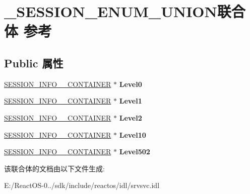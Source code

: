 \hypertarget{union___s_e_s_s_i_o_n___e_n_u_m___u_n_i_o_n}{}\section{\+\_\+\+S\+E\+S\+S\+I\+O\+N\+\_\+\+E\+N\+U\+M\+\_\+\+U\+N\+I\+O\+N联合体 参考}
\label{union___s_e_s_s_i_o_n___e_n_u_m___u_n_i_o_n}
\subsection*{Public 属性}
\begin{DoxyCompactItemize}
\item 
\mbox{\label{union___s_e_s_s_i_o_n___e_n_u_m___u_n_i_o_n_a33d9905dafc13625a026caff8927b6a0}} 
\hyperlink{struct___s_e_s_s_i_o_n___i_n_f_o__0___c_o_n_t_a_i_n_e_r}{S\+E\+S\+S\+I\+O\+N\+\_\+\+I\+N\+F\+O\+\_\+\_\+\+C\+O\+N\+T\+A\+I\+N\+ER} $\ast$ {\bfseries Level0}
\item 
\mbox{\label{union___s_e_s_s_i_o_n___e_n_u_m___u_n_i_o_n_ac4592f6b3760382035fba41421a91b5b}} 
\hyperlink{struct___s_e_s_s_i_o_n___i_n_f_o__1___c_o_n_t_a_i_n_e_r}{S\+E\+S\+S\+I\+O\+N\+\_\+\+I\+N\+F\+O\+\_\+\_\+\+C\+O\+N\+T\+A\+I\+N\+ER} $\ast$ {\bfseries Level1}
\item 
\mbox{\label{union___s_e_s_s_i_o_n___e_n_u_m___u_n_i_o_n_a2584550cf4b9e5794a95211b24f12030}} 
\hyperlink{struct___s_e_s_s_i_o_n___i_n_f_o__2___c_o_n_t_a_i_n_e_r}{S\+E\+S\+S\+I\+O\+N\+\_\+\+I\+N\+F\+O\+\_\+\_\+\+C\+O\+N\+T\+A\+I\+N\+ER} $\ast$ {\bfseries Level2}
\item 
\mbox{\label{union___s_e_s_s_i_o_n___e_n_u_m___u_n_i_o_n_aee015460e77df403dcf98aacb3b3b198}} 
\hyperlink{struct___s_e_s_s_i_o_n___i_n_f_o__10___c_o_n_t_a_i_n_e_r}{S\+E\+S\+S\+I\+O\+N\+\_\+\+I\+N\+F\+O\+\_\+\_\+\+C\+O\+N\+T\+A\+I\+N\+ER} $\ast$ {\bfseries Level10}
\item 
\mbox{\label{union___s_e_s_s_i_o_n___e_n_u_m___u_n_i_o_n_ad2227086a277ce15568efd3fcac0b8a4}} 
\hyperlink{struct___s_e_s_s_i_o_n___i_n_f_o__502___c_o_n_t_a_i_n_e_r}{S\+E\+S\+S\+I\+O\+N\+\_\+\+I\+N\+F\+O\+\_\+\_\+\+C\+O\+N\+T\+A\+I\+N\+ER} $\ast$ {\bfseries Level502}
\end{DoxyCompactItemize}


该联合体的文档由以下文件生成\+:\begin{DoxyCompactItemize}
\item 
E\+:/\+React\+O\+S-\/0../sdk/include/reactos/idl/srvsvc.\+idl\end{DoxyCompactItemize}
